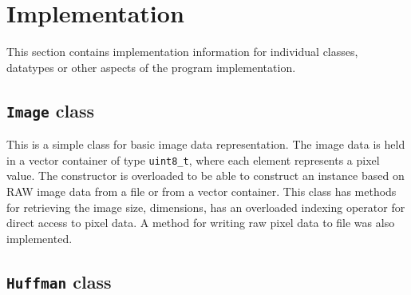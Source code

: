 \documentclass[pdftex, 11pt, a4paper, titlepage]{article}
\newcommand{\code}{\texttt}
\begin{document}
    \section{Implementation}
    This section contains implementation information for individual classes, datatypes or other aspects
    of the program implementation.

    \subsection{\code{Image} class} \label{sec:Image_class}
    This is a simple class for basic image data representation. The image data is held in a vector
    container of type \code{uint8\_t}, where each element represents a pixel value. The constructor is
    overloaded to be able to construct an instance based on RAW image data from a file or from a vector
    container. This class has
    methods for retrieving the image size, dimensions, has an overloaded indexing operator for direct
    access to pixel data. A method for writing raw pixel data to file was also implemented.

    \subsection{\code{Huffman} class} \label{sec:Huffman_class}
\end{document}
